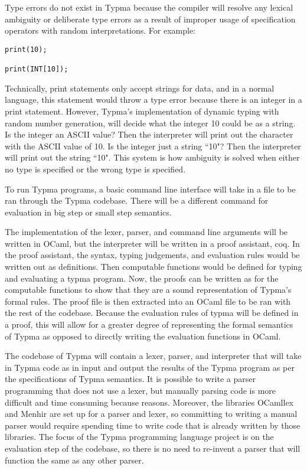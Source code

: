 \documentclass[10pt,twocolumn]{article}
\begin{document}
Type errors do not exist in Typma because the compiler will resolve any lexical ambiguity or deliberate type errors as a result of improper usage of specification operators with random interpretations. For example:

\begin{lstlisting}
print(10);

print(INT[10]);
\end{lstlisting}

Technically, print statements only accept strings for data, and in a normal language, this statement would throw a type error because there is an integer in a print statement. However, Typma's implementation of dynamic typing with random number generation, will decide what the integer 10 could be as a string. Is the integer an ASCII value? Then the interpreter will print out the character with the ASCII value of 10. Is the integer just a string ``10"? Then the interpreter will print out the string ``10". This system is how ambiguity is solved when either no type is specified or the wrong type is specified.

To run Typma programs, a basic command line interface will take in a file to be ran through the Typma codebase. There will be a different command for evaluation in big step or small step semantics.

The implementation of the lexer, parser, and command line arguments will be written in OCaml, but the interpreter will be written in a proof assistant, coq. In the proof assistant, the syntax, typing judgements, and evaluation rules would be written out as definitions. Then computable functions would be defined for typing and evaluating a typma program. Now, the proofs can be written as for the computable functions to show that they are a sound representation of Typma's formal rules. The proof file is then extracted into an OCaml file to be ran with the rest of the codebase. Because the evaluation rules of typma will be defined in a proof, this will allow for a greater degree of representing the formal semantics of Typma as opposed to directly writing the evaluation functions in OCaml. 

The codebase of Typma will contain a lexer, parser, and interpreter that will take in Typma code as in input and output the results of the Typma program as per the specifications of Typma semantics. It is possible to write a parser programming that does not use a lexer, but manually parsing code is more difficult and time consuming because reasons. Moreover, the libraries OCamllex and Menhir are set up for a parser and lexer, so committing to writing a manual parser would require spending time to write code that is already written by those libraries. The focus of the Typma programming language project is on the evaluation step of the codebase, so there is no need to re-invent a parser that will function the same as any other parser.
\end{document}
